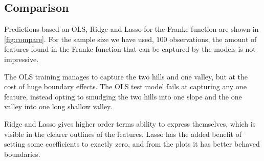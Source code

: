 \subsection{Comparison}

Predictions based on OLS, Ridge and Lasso for the Franke function are shown in
\cref{fig:compare}. For the sample size we have used, \(100\) observations, the
amount of features found in the Franke function that can be captured by the
models is not impressive.

The OLS training manages to capture the two hills and one valley, but at the
cost of huge boundary effects. The OLS test model fails at capturing any one
feature, instead opting to smudging the two hills into one slope and the one
valley into one long shallow valley.

Ridge and Lasso gives higher order terms ability to express themselves, which is visible
in the clearer outlines of the features. Lasso has the added benefit of setting
some coefficients to exactly zero, and from the plots it has better behaved
boundaries.

